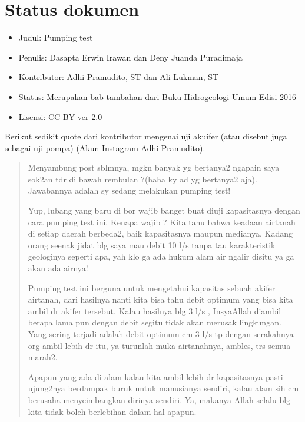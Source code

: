 \section{Status dokumen}

\begin{itemize}
\item Judul: Pumping test
\end{itemize}
\begin{itemize}
\item Penulis: Dasapta Erwin Irawan dan Deny Juanda Puradimaja
\end{itemize}
\begin{itemize}
\item Kontributor: Adhi Pramudito, ST dan Ali Lukman, ST
\end{itemize}
\begin{itemize}
\item Status: Merupakan bab tambahan dari Buku Hidrogeologi Umum Edisi 2016
\end{itemize}
\begin{itemize}
\item Lisensi: \href{http://creativecommons.org/licenses/by/2.0/}{CC-BY ver 2.0}
\end{itemize}

Berikut sedikit quote dari kontributor mengenai uji akuifer (atau disebut juga sebagai uji pompa) (Akun Instagram Adhi Pramudito).

\begin{quote}
Menyambung post sblmnya, mgkn banyak yg bertanya2 ngapain saya sok2an tdr di bawah rembulan ?(haha ky ad yg bertanya2 aja). Jawabannya adalah sy sedang melakukan pumping test! 

Yup, lubang yang baru di bor wajib banget buat diuji kapasitasnya dengan cara pumping test ini. Kenapa wajib ? Kita tahu bahwa keadaan airtanah di setiap daerah berbeda2, baik kapasitasnya maupun medianya. Kadang orang seenak jidat blg saya mau debit 10 l/s tanpa tau karakteristik geologinya seperti apa, yah klo ga ada hukum alam air ngalir disitu ya ga akan ada airnya!

Pumping test ini berguna untuk mengetahui kapasitas sebuah akifer airtanah, dari hasilnya nanti kita bisa tahu debit optimum yang bisa kita ambil dr akifer tersebut. Kalau hasilnya blg 3 l/s , InsyaAllah diambil berapa lama pun dengan debit segitu tidak akan merusak lingkungan. Yang sering terjadi adalah debit optimum cm 3 l/s tp dengan serakahnya org ambil lebih dr itu, ya turunlah muka airtanahnya, ambles, trs semua marah2.

Apapun yang ada di alam kalau kita ambil lebih dr kapasitasnya pasti ujung2nya berdampak buruk untuk manusianya sendiri, kalau alam sih cm berusaha menyeimbangkan dirinya sendiri. Ya, makanya Allah selalu blg kita tidak boleh berlebihan dalam hal apapun.
\end{quote}